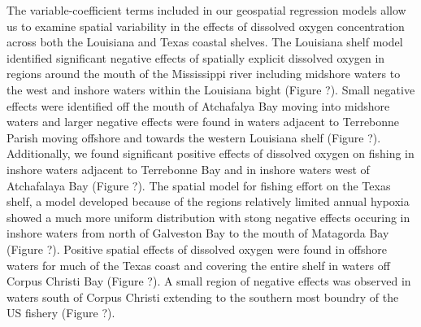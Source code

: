 \documentclass[10pt]{article}
\begin{document}
The variable-coefficient terms included in our geospatial regression models allow us to examine spatial variability in the effects of dissolved oxygen concentration across both the Louisiana and Texas coastal shelves.  The Louisiana shelf model identified significant negative effects of spatially explicit dissolved oxygen in regions around the mouth of the Mississippi river including midshore waters to the west and inshore waters within the Louisiana bight (Figure ?).  Small negative effects were identified off the mouth of Atchafalya Bay moving into midshore waters and larger negative effects were found in waters adjacent to Terrebonne Parish moving offshore and towards the western Louisiana shelf (Figure ?). Additionally, we found significant positive effects of dissolved oxygen on fishing in inshore waters adjacent to Terrebonne Bay and in inshore waters west of Atchafalaya Bay (Figure ?). The spatial model for fishing effort on the Texas shelf, a model developed because of the regions relatively limited annual hypoxia showed a much more uniform distribution with stong negative effects occuring in inshore waters from north of Galveston Bay to the mouth of Matagorda Bay (Figure ?).  Positive spatial effects of dissolved oxygen were found in offshore waters for much of the Texas coast and covering the entire shelf in waters off Corpus Christi Bay (Figure ?).  A small region of negative effects was observed in waters south of Corpus Christi extending to the southern most boundry of the US fishery (Figure ?).  
\end{document}
